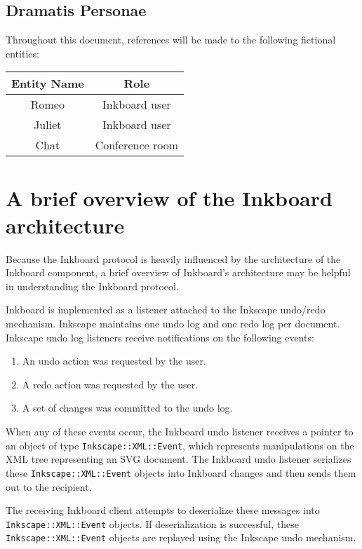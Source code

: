 \documentclass[11pt]{article}
\begin{document}
\subsection{Dramatis Personae}
Throughout this document, references will be made to the following fictional entities:
\begin{center}
\begin{tabular}[t]{|c|c|}
\hline
Entity Name & Role \\
\hline
Romeo & Inkboard user \\
\hline
Juliet & Inkboard user \\
\hline
Chat & Conference room \\
\hline
\end{tabular}
\end{center}

\section{A brief overview of the Inkboard architecture}
Because the Inkboard protocol is heavily influenced by the architecture of the Inkboard component, a brief overview of Inkboard's architecture may be helpful in understanding the Inkboard protocol.

Inkboard is implemented as a listener attached to the Inkscape undo/redo mechanism.  Inkscape maintains one undo log and one redo log per document.  Inkscape undo log listeners receive notifications on the following events:

\begin{enumerate}
\item An undo action was requested by the user.
\item A redo action was requested by the user.
\item A set of changes was committed to the undo log.
\end{enumerate}

When any of these events occur, the Inkboard undo listener receives a pointer to an object of type \texttt{Inkscape::XML::Event}, which represents manipulations on the XML tree representing an SVG document.  The Inkboard undo listener serializes these \texttt{Inkscape::XML::Event} objects into Inkboard changes and then sends them out to the recipient.

The receiving Inkboard client attempts to deserialize these messages into \texttt{Inkscape::XML::Event} objects.  If deserialization is successful, these \texttt{Inkscape::XML::Event} objects are replayed using the Inkscape undo mechanism.
\end{document}
